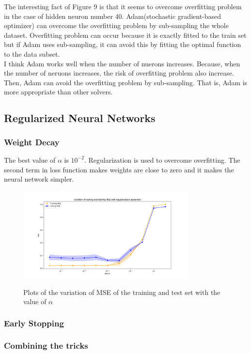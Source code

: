 \documentclass[a4paper]{article}
\begin{document}
The interesting fact of Figure 9 is that it seems to overcome overfitting problem in the case of hidden neuron number 40. Adam(stochastic gradient-based optimizer) can overcome the overfitting problem by sub-sampling the whole dataset. Overfitting problem can occur because it is exactly fitted to the train set but if Adam uses sub-sampling, it can avoid this by fitting the optimal function to the data subset.\\
I think Adam works well when the number of nuerons increases. Because, when the number of neruons increases, the risk of overfitting problem also increase. Then, Adam can avoid the overfitting problem by sub-sampling. That is, Adam is more appropriate than other solvers.
\subsection{Regularized Neural Networks}
\subsubsection{Weight Decay}
The best value of $\alpha$ is $10^{-2}$. Regularization is used to overcome
overfitting. The second term in loss function makes weights are close to
zero and it makes the neural network simpler.
\begin{figure}[h]
  \begin{center}
  \includegraphics[width=0.8\textwidth]{ex_1_2_a.png}\\
  \caption{Plots of the variation of MSE of the training and test set with the value of $\alpha$}
  \end{center}
\end{figure}
\subsubsection{Early Stopping}
\subsubsection{Combining the tricks}
\end{document}
